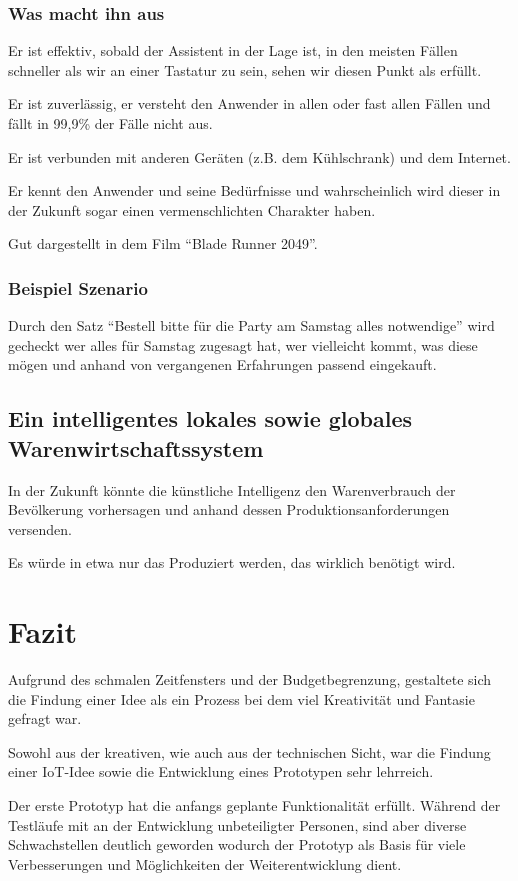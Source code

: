 \documentclass{sigchi}
\begin{document}
\subsubsection{Was macht ihn aus}
Er ist effektiv, sobald der Assistent in der Lage ist, in den meisten Fällen schneller als wir an einer Tastatur zu sein, sehen wir diesen Punkt als erfüllt.

Er ist zuverlässig, er versteht den Anwender in allen oder fast allen Fällen und fällt in 99,9\% der Fälle nicht aus.

Er ist verbunden mit anderen Geräten (z.B. dem Kühlschrank) und dem Internet.

Er kennt den Anwender und seine Bedürfnisse und wahrscheinlich wird dieser in der Zukunft sogar einen vermenschlichten Charakter haben.

Gut dargestellt in dem Film “Blade Runner 2049”.

\subsubsection{Beispiel Szenario}
Durch den Satz “Bestell bitte für die Party am Samstag alles notwendige” wird gecheckt wer alles für Samstag zugesagt hat, wer vielleicht kommt, was diese mögen und anhand von vergangenen Erfahrungen passend eingekauft.

\subsection{Ein intelligentes lokales sowie globales Warenwirtschaftssystem}
In der Zukunft könnte die künstliche Intelligenz den Warenverbrauch der Bevölkerung vorhersagen und anhand dessen Produktionsanforderungen versenden.

Es würde in etwa nur das Produziert werden, das wirklich benötigt wird.

\section{Fazit}
Aufgrund des schmalen Zeitfensters und der Budgetbegrenzung, gestaltete sich die Findung einer Idee als ein Prozess bei dem viel Kreativität und Fantasie gefragt war.

Sowohl aus der kreativen, wie auch aus der technischen Sicht, war die Findung einer IoT-Idee sowie die Entwicklung eines Prototypen sehr lehrreich.

Der erste Prototyp hat die anfangs geplante Funktionalität erfüllt. Während der Testläufe mit an der Entwicklung unbeteiligter Personen, sind aber diverse Schwachstellen deutlich geworden wodurch der Prototyp als Basis für viele Verbesserungen und Möglichkeiten der Weiterentwicklung dient.
\end{document}
